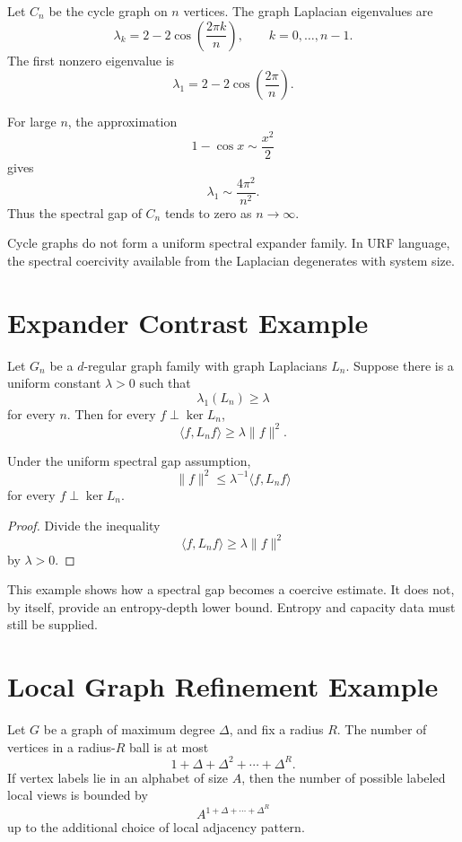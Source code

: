 Let \(C_n\) be the cycle graph on \(n\) vertices. The graph Laplacian
eigenvalues are
\[
\lambda_k=2-2\cos\left(\frac{2\pi k}{n}\right),
\qquad
k=0,\ldots,n-1.
\]
The first nonzero eigenvalue is
\[
\lambda_1=2-2\cos\left(\frac{2\pi}{n}\right).
\]

For large \(n\), the approximation
\[
1-\cos x\sim \frac{x^2}{2}
\]
gives
\[
\lambda_1\sim \frac{4\pi^2}{n^2}.
\]
Thus the spectral gap of \(C_n\) tends to zero as \(n\to\infty\).

\begin{remark}[Interpretation]
Cycle graphs do not form a uniform spectral expander family. In URF language,
the spectral coercivity available from the Laplacian degenerates with system
size.
\end{remark}

\section{Expander Contrast Example}

Let \(G_n\) be a \(d\)-regular graph family with graph Laplacians \(L_n\).
Suppose there is a uniform constant \(\lambda>0\) such that
\[
\lambda_1(L_n)\ge \lambda
\]
for every \(n\). Then for every \(f\perp\ker L_n\),
\[
\langle f,{L_n}f\rangle\ge \lambda\|f\|^2.
\]

\begin{theorem}
Under the uniform spectral gap assumption,
\[
\|f\|^2\le \lambda^{-1}\langle f,{L_n}f\rangle
\]
for every \(f\perp\ker L_n\).
\end{theorem}

\begin{proof}
Divide the inequality
\[
\langle f,{L_n}f\rangle\ge \lambda\|f\|^2
\]
by \(\lambda>0\).
\end{proof}

This example shows how a spectral gap becomes a coercive estimate. It does
not, by itself, provide an entropy-depth lower bound. Entropy and capacity
data must still be supplied.

\section{Local Graph Refinement Example}

Let \(G\) be a graph of maximum degree \(\Delta\), and fix a radius \(R\). The
number of vertices in a radius-\(R\) ball is at most
\[
1+\Delta+\Delta^2+\cdots+\Delta^R.
\]
If vertex labels lie in an alphabet of size \(A\), then the number of possible
labeled local views is bounded by
\[
A^{1+\Delta+\cdots+\Delta^R}
\]
up to the additional choice of local adjacency pattern.

